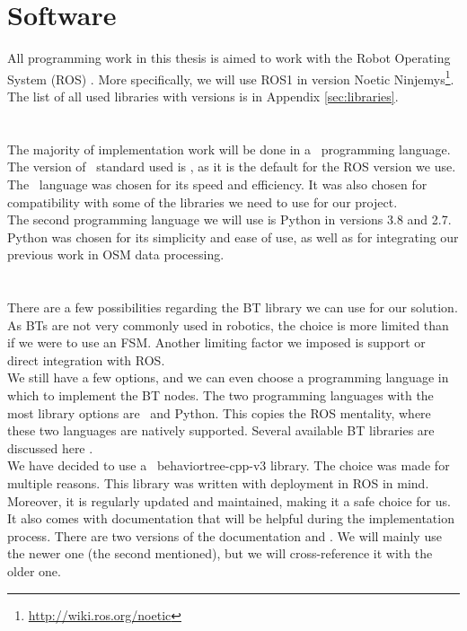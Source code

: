 \section{Software}
    All programming work in this thesis is aimed to work with the Robot Operating System (ROS) \cite{ROS}. More specifically, we will use ROS1 in version Noetic Ninjemys\footnote{\url{http://wiki.ros.org/noetic}}.\\
    The list of all used libraries with versions is in Appendix \ref{sec:libraries}.\\\\
    \\
        The majority of implementation work will be done in a \CC\ programming language. The version of \CC\ standard used is , as it is the default for the ROS version we use.\\
        The \CC\ language was chosen for its speed and efficiency. It was also chosen for compatibility with some of the libraries we need to use for our project.\\
        The second programming language we will use is Python in versions 3.8 and 2.7. Python was chosen for its simplicity and ease of use, as well as for integrating our previous work in OSM data processing.\\\\
    \\
        There are a few possibilities regarding the BT library we can use for our solution. As BTs are not very commonly used in robotics, the choice is more limited than if we were to use an FSM. Another limiting factor we imposed is support or direct integration with ROS.\\
        We still have a few options, and we can even choose a programming language in which to implement the BT nodes. The two programming languages with the most library options are \CC\ and Python. This copies the ROS mentality, where these two languages are natively supported. Several available BT libraries are discussed here \cite{BT_FSM}.\\
        We have decided to use a \CC\ behaviortree-cpp-v3 library. The choice was made for multiple reasons. This library was written with deployment in ROS in mind. Moreover, it is regularly updated and maintained, making it a safe choice for us. It also comes with documentation that will be helpful during the implementation process. There are two versions of the documentation \cite{BT_docs} and \cite{BT_docs_new}. We will mainly use the newer one (the second mentioned), but we will cross-reference it with the older one.\\
